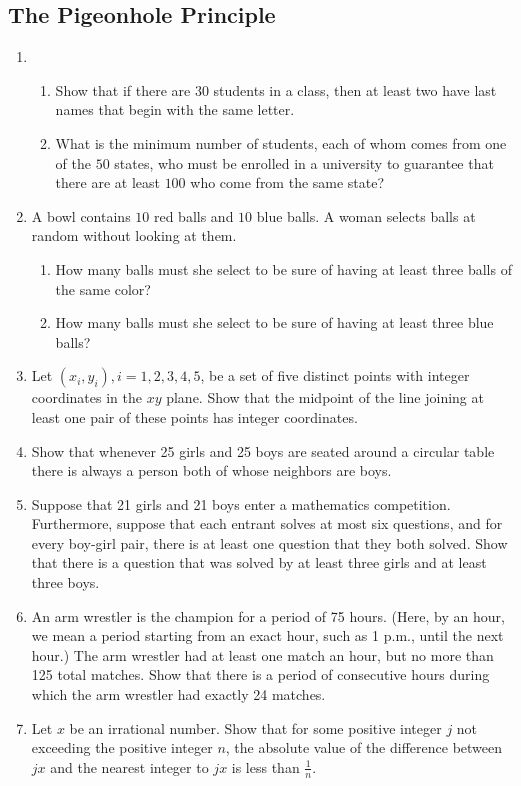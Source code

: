 \documentclass{../../cls/sig-alternate-05-2015}
\begin{document}
\subsection{The Pigeonhole Principle}
\begin{enumerate}
	\item \begin{enumerate}
		\item Show that if there are $30$ students in a class, then at least
		two have last names that begin with the same letter.
		
		\item What is the minimum number of students, each of whom
		comes from one of the $50$ states, who must be enrolled in
		a university to guarantee that there are at least $100$ who
		come from the same state?
	\end{enumerate}

	\item A bowl contains $10$ red balls and $10$ blue balls. A woman
	selects balls at random without looking at them.
	\begin{enumerate}
	\item How many balls must she select to be sure of having
	at least three balls of the same color?
	\item How many balls must she select to be sure of having
	at least three blue balls?
	\end{enumerate}

	\item Let $(x_i, y_i), i = 1, 2, 3, 4, 5$, be a set of five distinct points with integer coordinates in the $xy$ plane. Show that the
	midpoint of the line joining at least one pair of these points has integer coordinates.
	
	\item Show that whenever 25 girls and 25 boys are seated around a circular table there is always a person both of whose neighbors are boys.
	
	\item Suppose that 21 girls and 21 boys enter a mathematics competition. Furthermore, suppose that each entrant solves at most six questions, and for every boy-girl pair, there is at least one question that they both solved. Show that there is a question that was solved by at least three girls and at least three boys.
	
	\item An arm wrestler is the champion for a period of 75 hours. (Here, by an hour, we mean a period starting from an exact hour, such as 1 p.m., until the next hour.) The arm wrestler had at least one match an hour, but no more than 125 total matches. Show that there is a period of consecutive hours during which the arm wrestler had exactly 24 matches.
	
	\item Let $x$ be an irrational number. Show that for some positive integer $j$ not exceeding the positive integer $n$, the absolute value of the difference between $jx$ and the nearest integer to $jx$ is less than $\frac{1}{n}$.
\end{enumerate}
\end{document}

